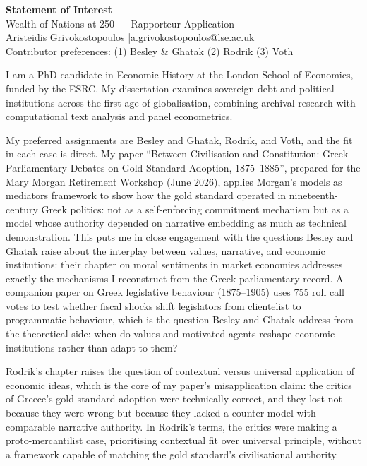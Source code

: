 \documentclass[11pt,a4paper]{article}
\begin{document}
\begin{center}
{\large\textbf{Statement of Interest}}\\[0.4em]
{\normalsize Wealth of Nations at 250 --- Rapporteur Application}\\[0.2em]
{\small Aristeidis Grivokostopoulos \quad|\quad a.grivokostopoulos@lse.ac.uk}\\[0.2em]
{\small Contributor preferences: (1) Besley \& Ghatak \quad (2) Rodrik \quad (3) Voth}
\end{center}

\bigskip

I am a PhD candidate in Economic History at the London School of Economics, funded by the ESRC. My dissertation examines sovereign debt and political institutions across the first age of globalisation, combining archival research with computational text analysis and panel econometrics.

My preferred assignments are Besley and Ghatak, Rodrik, and Voth, and the fit in each case is direct. My paper ``Between Civilisation and Constitution: Greek Parliamentary Debates on Gold Standard Adoption, 1875--1885'', prepared for the Mary Morgan Retirement Workshop (June 2026), applies Morgan's models as mediators framework to show how the gold standard operated in nineteenth-century Greek politics: not as a self-enforcing commitment mechanism but as a model whose authority depended on narrative embedding as much as technical demonstration. This puts me in close engagement with the questions Besley and Ghatak raise about the interplay between values, narrative, and economic institutions: their chapter on moral sentiments in market economies addresses exactly the mechanisms I reconstruct from the Greek parliamentary record. A companion paper on Greek legislative behaviour (1875--1905) uses 755 roll call votes to test whether fiscal shocks shift legislators from clientelist to programmatic behaviour, which is the question Besley and Ghatak address from the theoretical side: when do values and motivated agents reshape economic institutions rather than adapt to them?

Rodrik's chapter raises the question of contextual versus universal application of economic ideas, which is the core of my paper's misapplication claim: the critics of Greece's gold standard adoption were technically correct, and they lost not because they were wrong but because they lacked a counter-model with comparable narrative authority. In Rodrik's terms, the critics were making a proto-mercantilist case, prioritising contextual fit over universal principle, without a framework capable of matching the gold standard's civilisational authority.
\end{document}
